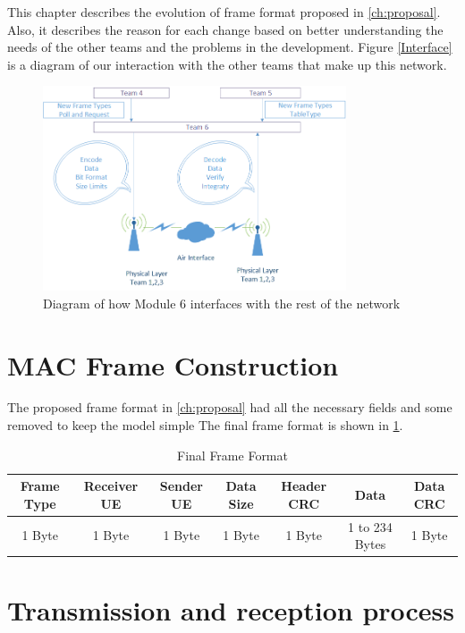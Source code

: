 This chapter describes the evolution of frame format proposed in \ref{ch:proposal}. Also, it describes the reason for each change based on better understanding the needs of the other teams and the problems in the development. Figure \ref{Interface} is a diagram of our interaction with the other teams that make up this network. 
\begin{figure}[ht]
    \centering
    \includegraphics[width=0.8\textwidth]{Interface_diagram.PNG}
    \caption{Diagram of how Module 6 interfaces with the rest of the network}
    \label{fig:Interface}
\end{figure}


\section{MAC Frame Construction}
The proposed frame format in \ref{ch:proposal} had all the necessary fields and some removed to keep the model simple
The final frame format is  shown in \ref{tab:finalFrame}.

\begin{table}
\begin{tabular}{| c | c | c | c | c | c | c | }
  \hline                       
  Frame Type & Receiver UE & Sender UE & Data Size & Header CRC & Data & Data CRC\\
  \hline
	1 Byte & 1 Byte & 1 Byte & 1 Byte & 1 Byte & 1 to 234 Bytes & 1 Byte\\
  
  \hline  
\end{tabular}
 \caption{Final Frame Format}
	\label{tab:finalFrame}
\end{table}

\section{Transmission and reception process}

